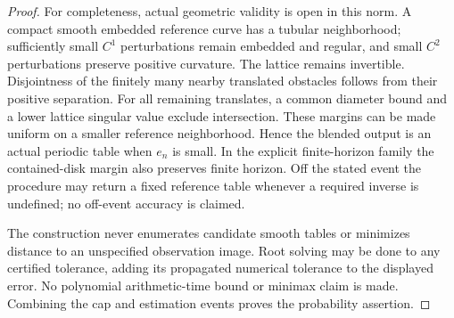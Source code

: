 \begin{proof}
For completeness, actual geometric validity is open in this norm.
A compact smooth embedded reference curve has a tubular neighborhood;
sufficiently small $C^1$ perturbations remain embedded and regular,
and small $C^2$ perturbations preserve positive curvature.  The lattice
remains invertible.  Disjointness of the finitely many nearby translated
obstacles follows from their positive separation.  For all remaining
translates, a common diameter bound and a lower lattice singular value
exclude intersection.  These margins can be made uniform on a smaller
reference neighborhood.  Hence the blended output is an actual periodic
table when $e_n$ is small.  In the explicit finite-horizon family the
contained-disk margin also preserves finite horizon.  Off the stated
event the procedure may return a fixed reference table whenever a
required inverse is undefined; no off-event accuracy is claimed.

The construction never enumerates candidate smooth tables or minimizes
distance to an unspecified observation image.  Root solving may be done
to any certified tolerance, adding its propagated numerical tolerance
to the displayed error.  No polynomial arithmetic-time bound or minimax
claim is made.  Combining the cap and estimation events proves the
probability assertion.
\end{proof}
